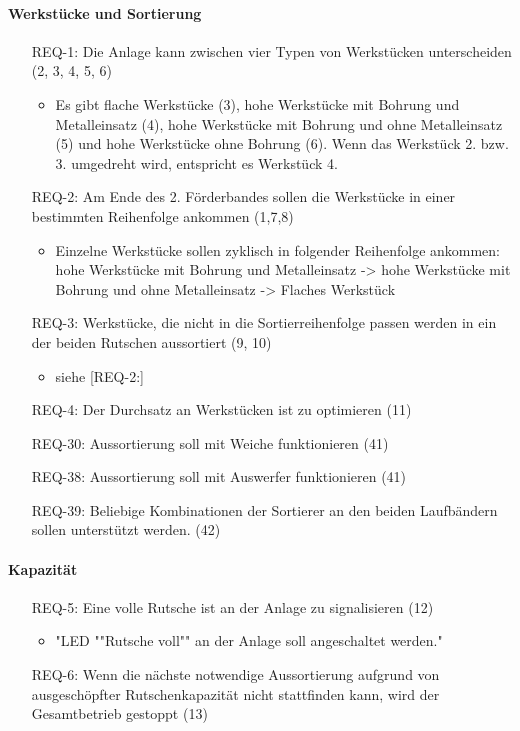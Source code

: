 \paragraph{Werkstücke und Sortierung}
\begin{itemize}
    \item[REQ-1:] Die Anlage kann zwischen vier Typen von Werkstücken unterscheiden (2, 3, 4, 5, 6)
    \begin{itemize}
        \item Es gibt flache Werkstücke (3), hohe Werkstücke mit Bohrung und Metalleinsatz (4), hohe Werkstücke mit Bohrung und ohne Metalleinsatz (5) und hohe Werkstücke ohne Bohrung (6). Wenn das Werkstück 2. bzw. 3. umgedreht wird, entspricht es Werkstück 4.
    \end{itemize}
    \item[REQ-2:] Am Ende des 2. Förderbandes sollen die Werkstücke in einer bestimmten Reihenfolge ankommen (1,7,8)
    \begin{itemize}
        \item Einzelne Werkstücke sollen zyklisch in folgender Reihenfolge ankommen: hohe Werkstücke mit Bohrung und Metalleinsatz -> hohe Werkstücke mit Bohrung und ohne Metalleinsatz -> Flaches Werkstück
    \end{itemize}
    \item[REQ-3:] Werkstücke, die nicht in die Sortierreihenfolge passen werden in ein der beiden Rutschen aussortiert (9, 10)
    \begin{itemize}
        \item siehe [REQ-2:]
    \end{itemize}
    \item[REQ-4:] Der Durchsatz an Werkstücken ist zu optimieren (11)
    \item[REQ-30:] Aussortierung soll mit Weiche funktionieren (41)
    \item[REQ-38:] Aussortierung soll mit Auswerfer funktionieren (41)
    \item[REQ-39:] Beliebige Kombinationen der Sortierer an den beiden Laufbändern sollen unterstützt werden. (42)
\end{itemize}

\paragraph{Kapazität}
\begin{itemize}
    \item[REQ-5:] Eine volle Rutsche ist an der Anlage zu signalisieren (12)
    \begin{itemize}
        \item "LED ""Rutsche voll"" an der Anlage soll angeschaltet werden."
    \end{itemize}
    \item[REQ-6:] Wenn die nächste notwendige Aussortierung aufgrund von ausgeschöpfter Rutschenkapazität nicht stattfinden kann, wird der Gesamtbetrieb gestoppt (13)
\end{itemize}

